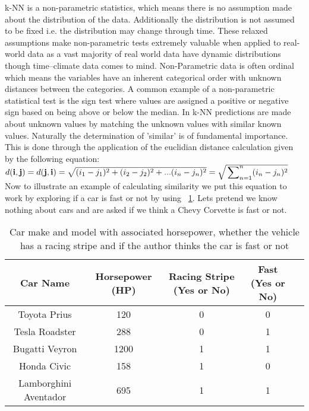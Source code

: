 k-NN is a non-parametric statistics, which means there is no
assumption made about the distribution of the data. Additionally the
distribution is not assumed to be fixed i.e. the distribution may
change through time. These relaxed assumptions make non-parametric
tests extremely valuable when applied to real-world data as a vast
majority of real world data have dynamic distributions though
time--climate data comes to mind. Non-Parametric data is often ordinal
which means the variables have an inherent categorical order with
unknown distances between the categories. A common example of a
non-parametric statistical test is the sign test where values are
assigned a positive or negative sign based on being above or below the
median. In k-NN predictions are made about unknown values by matching
the unknown values with similar known values. Naturally the
determination of 'similar' is of fundamental importance. This is done
through the application of the euclidian distance calculation given by
the following equation: 
${d(\mathbf{i},\mathbf{j})} = {d(\mathbf{j},\mathbf{i})} =
\sqrt{{(i_1 - j_1)^2 + (i_2 - j_2)^2 +... (i_n - j_n)^2 } }  =
\sqrt{\sideset{}{}\sum_{n=1}^n(i_n - j_n)^2}$
Now to illustrate an example of calculating similarity we put this
equation to work by exploring if a car is fast or not by using
~\ref{T:fast-cars}. Lets pretend we know nothing about cars and are
asked if we think a Chevy Corvette is fast or not.  

\begin{table}[htb]
\caption{Car make and model with associated horsepower, whether the
  vehicle has a racing stripe and if the author thinks the car is fast
or not}\label{T:fast-cars}
\bigskip
\begin{center}
\begin{tabular}{ c c c c c }
 Car Name  & Horsepower (HP)  & Racing Stripe (Yes or No) & Fast (Yes
                                                           or No) \\
\toprule
 Toyota Prius & 120 & 0 & 0 \\ 
 Tesla Roadster& 288 & 0 & 1 \\  
 Bugatti  Veyron& 1200 & 1 & 1 \\
 Honda Civic & 158 & 1 & 0 \\
 Lamborghini Aventador & 695 & 1 & 1 \\

\bottomrule
\end{tabular}
\end{center}
\end{table}

